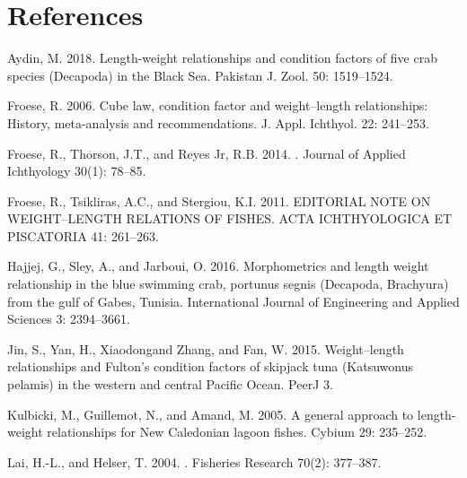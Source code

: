 \documentclass[12pt]{article}\usepackage[]{graphicx}\usepackage[]{color}
\begin{document}
\section{References}\label{references}

\noindent \vspace{-2em} \setlength{\parindent}{-0.2in} \setlength{\leftskip}{0.2in} \setlength{\parskip}{8pt}

\label{refs}
\begin{CSLReferences}{1}{0}
Aydin, M. 2018. Length-weight relationships and condition factors of five crab species ({D}ecapoda) in the {B}lack {S}ea. Pakistan J. Zool. 50: 1519--1524.

Froese, R. 2006. Cube law, condition factor and weight--length relationships: History, meta-analysis and recommendations. J. Appl. Ichthyol. 22: 241--253.

Froese, R., Thorson, J.T., and Reyes Jr, R.B. 2014. . Journal of Applied Ichthyology 30(1): 78--85.

Froese, R., Tsikliras, A.C., and Stergiou, K.I. 2011. EDITORIAL NOTE ON WEIGHT--LENGTH RELATIONS OF FISHES. ACTA ICHTHYOLOGICA ET PISCATORIA 41: 261--263.

Hajjej, G., Sley, A., and Jarboui, O. 2016. Morphometrics and length weight relationship in the blue swimming crab, portunus segnis ({D}ecapoda, {B}rachyura) from the gulf of {G}abes, {T}unisia. International Journal of Engineering and Applied Sciences 3: 2394--3661.

Jin, S., Yan, H., Xiaodongand Zhang, and Fan, W. 2015. Weight--length relationships and {F}ulton's condition factors of skipjack tuna ({K}atsuwonus pelamis) in the western and central {P}acific {O}cean. PeerJ 3.

Kulbicki, M., Guillemot, N., and Amand, M. 2005. A general approach to length-weight relationships for {N}ew {C}aledonian lagoon fishes. Cybium 29: 235--252.

Lai, H.-L., and Helser, T. 2004. . Fisheries Research 70(2): 377--387.


\end{CSLReferences}
\end{document}
